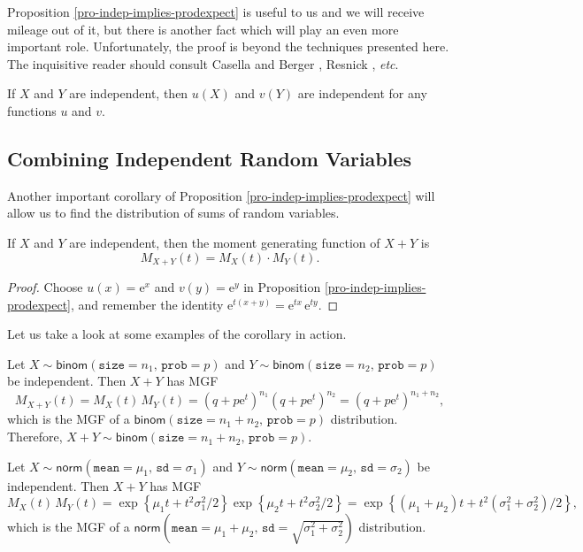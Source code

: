 Proposition \ref{pro-indep-implies-prodexpect} is useful to us and we will
receive mileage out of it, but there is another fact which will play
an even more important role. Unfortunately, the proof is beyond the
techniques presented here. The inquisitive reader should consult
Casella and Berger \cite{Casella2002}, Resnick \cite{Resnick1999},
\emph{etc}.

\begin{fact}
\label{fac-indep-then-function-indep} If \(X\) and \(Y\) are independent,
then \(u(X)\) and \(v(Y)\) are independent for any functions \(u\) and
\(v\).
\end{fact}

\subsection{Combining Independent Random Variables}
\label{sec-7-4-2}

Another important corollary of Proposition
\ref{pro-indep-implies-prodexpect} will allow us to find the distribution of
sums of random variables.

\begin{cor}
If \(X\) and \(Y\) are independent, then the moment generating
function of \(X+Y\) is
\begin{equation}
M_{X+Y}(t)=M_{X}(t)\cdot M_{Y}(t).
\end{equation}
\end{cor}

\begin{proof}
Choose \(u(x)=\mathrm{e}^{x}\) and \(v(y)=\mathrm{e}^{y}\) in
Proposition \ref{pro-indep-implies-prodexpect}, and remember the identity
\(\mathrm{e}^{t(x+y)}=\mathrm{e}^{tx}\,\mathrm{e}^{ty}\).
\end{proof}

Let us take a look at some examples of the corollary in action.


Let \(X\sim\mathsf{binom}(\mathtt{size}=n_{1},\,\mathtt{prob}=p)\) and
\(Y\sim\mathsf{binom}(\mathtt{size}=n_{2},\,\mathtt{prob}=p)\) be
independent. Then \(X+Y\) has MGF \[ M_{X+Y}(t)=M_{X}(t)\,
M_{Y}(t)=\left(q+p\mathrm{e}^{t}\right)^{n_{1}}\left(q+p\mathrm{e}^{t}\right)^{n_{2}}=\left(q+p\mathrm{e}^{t}\right)^{n_{1}+n_{2}},
\] which is the MGF of a
\(\mathsf{binom}(\mathtt{size}=n_{1}+n_{2},\,\mathtt{prob}=p)\)
distribution. Therefore,
\(X+Y\sim\mathsf{binom}(\mathtt{size}=n_{1}+n_{2},\,\mathtt{prob}=p)\).



Let
\(X\sim\mathsf{norm}(\mathtt{mean}=\mu_{1},\,\mathtt{sd}=\sigma_{1})\)
and
\(Y\sim\mathsf{norm}(\mathtt{mean}=\mu_{2},\,\mathtt{sd}=\sigma_{2})\)
be independent. Then \(X+Y\) has MGF \[ M_{X}(t)\,
M_{Y}(t)=\exp\left\{ \mu_{1}t+t^{2}\sigma_{1}^{2}/2\right\}
\exp\left\{ \mu_{2}t+t^{2}\sigma_{2}^{2}/2\right\} =\exp\left\{
\left(\mu_{1}+\mu_{2}\right)t+t^{2}\left(\sigma_{1}^{2}+\sigma_{2}^{2}\right)/2\right\}
, \] which is the MGF of a
\(\mathsf{norm}\left(\mathtt{mean}=\mu_{1}+\mu_{2},\,\mathtt{sd}=\sqrt{\sigma_{1}^{2}+\sigma_{2}^{2}}\right)\)
distribution.


